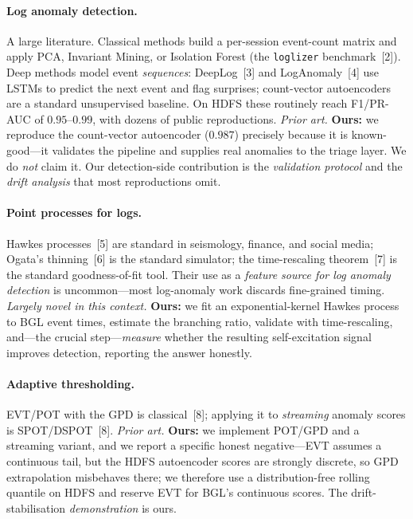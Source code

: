 \documentclass[11pt,a4paper]{article}
\newcommand{\ours}[1]{{\color{good}\textbf{#1}}}
\newcommand{\code}[1]{\texttt{\small #1}}
\begin{document}
\paragraph{Log anomaly detection.} A large literature. Classical methods build a
per-session event-count matrix and apply PCA, Invariant Mining, or Isolation
Forest (the \code{loglizer} benchmark~[2]). Deep methods model event
\emph{sequences}: DeepLog~[3] and LogAnomaly~[4] use LSTMs to predict the next
event and flag surprises; count-vector autoencoders are a standard unsupervised
baseline. On HDFS these routinely reach F1/PR-AUC of $0.95$--$0.99$, with dozens
of public reproductions. \emph{Prior art.} \ours{Ours:} we reproduce the
count-vector autoencoder ($0.987$) precisely because it is known-good---it
validates the pipeline and supplies real anomalies to the triage layer. We do
\emph{not} claim it. Our detection-side contribution is the \emph{validation
protocol} and the \emph{drift analysis} that most reproductions omit.

\paragraph{Point processes for logs.} Hawkes processes~[5] are standard in
seismology, finance, and social media; Ogata's thinning~[6] is the standard
simulator; the time-rescaling theorem~[7] is the standard goodness-of-fit tool.
Their use as a \emph{feature source for log anomaly detection} is uncommon---most
log-anomaly work discards fine-grained timing. \emph{Largely novel in this
context.} \ours{Ours:} we fit an exponential-kernel Hawkes process to BGL event
times, estimate the branching ratio, validate with time-rescaling, and---the
crucial step---\emph{measure} whether the resulting self-excitation signal
improves detection, reporting the answer honestly.

\paragraph{Adaptive thresholding.} EVT/POT with the GPD is classical~[8];
applying it to \emph{streaming} anomaly scores is SPOT/DSPOT~[8]. \emph{Prior
art.} \ours{Ours:} we implement POT/GPD and a streaming variant, and we report a
specific honest negative---EVT assumes a continuous tail, but the HDFS
autoencoder scores are strongly discrete, so GPD extrapolation misbehaves there;
we therefore use a distribution-free rolling quantile on HDFS and reserve EVT for
BGL's continuous scores. The drift-stabilisation \emph{demonstration} is ours.
\end{document}
